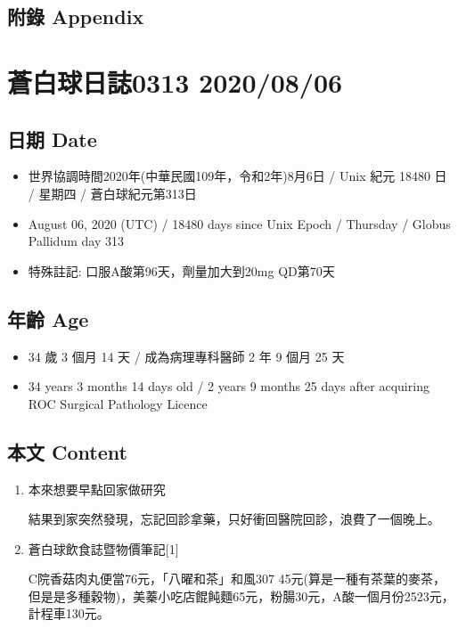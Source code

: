 \documentclass[a5paper, 11pt
]{book}
\providecommand{\tightlist}{%
  \setlength{\itemsep}{0pt}\setlength{\parskip}{0pt}}
\begin{document}
\hypertarget{ux9644ux9304-appendix-65}{%
\subsection{附錄 Appendix}\label{ux9644ux9304-appendix-65}}

\hypertarget{ux84bcux767dux7403ux65e5ux8a8c0313-20200806}{%
\section{蒼白球日誌0313
2020/08/06}\label{ux84bcux767dux7403ux65e5ux8a8c0313-20200806}}

\hypertarget{ux65e5ux671f-date-66}{%
\subsection{日期 Date}\label{ux65e5ux671f-date-66}}

\begin{itemize}
\tightlist
\item
  世界協調時間2020年(中華民國109年，令和2年)8月6日 / Unix 紀元 18480 日
  / 星期四 / 蒼白球紀元第313日
\item
  August 06, 2020 (UTC) / 18480 days since Unix Epoch / Thursday /
  Globus Pallidum day 313
\item
  特殊註記: 口服A酸第96天，劑量加大到20mg QD第70天
\end{itemize}

\hypertarget{ux5e74ux9f61-age-66}{%
\subsection{年齡 Age}\label{ux5e74ux9f61-age-66}}

\begin{itemize}
\tightlist
\item
  34 歲 3 個月 14 天 / 成為病理專科醫師 2 年 9 個月 25 天
\item
  34 years 3 months 14 days old / 2 years 9 months 25 days after
  acquiring ROC Surgical Pathology Licence
\end{itemize}

\hypertarget{ux672cux6587-content-66}{%
\subsection{本文 Content}\label{ux672cux6587-content-66}}

\begin{enumerate}
\def\labelenumi{\arabic{enumi}.}
\item
  本來想要早點回家做研究

  結果到家突然發現，忘記回診拿藥，只好衝回醫院回診，浪費了一個晚上。
\item
  蒼白球飲食誌暨物價筆記{[}1{]}

  C院香菇肉丸便當76元，「八曜和茶」和風307
  45元(算是一種有茶葉的麥茶，但是是多種穀物)，美蓁小吃店餛飩麵65元，粉腸30元，A酸一個月份2523元，計程車130元。
\end{enumerate}
\end{document}
